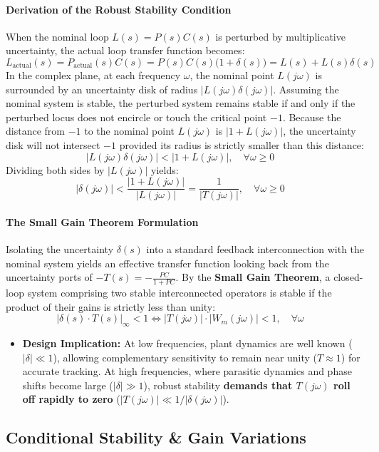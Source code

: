 \documentclass[12pt,onecolumn,twoside ]{article}
\begin{document}
	\paragraph{Derivation of the Robust Stability Condition}
	When the nominal loop $L(s) = P(s)C(s)$ is perturbed by multiplicative uncertainty, the actual loop transfer function becomes: \[
	L_{\text{actual}}(s) = P_{\text{actual}}(s)C(s) = P(s)C(s)\big(1 + \delta(s)\big) = L(s) + L(s)\delta(s) \quad
	\]
	In the complex plane, at each frequency $\omega$, the nominal point $L(j\omega)$ is surrounded by an uncertainty disk of radius $|L(j\omega)\delta(j\omega)|$. Assuming the nominal system is stable, the perturbed system remains stable if and only if the perturbed locus does not encircle or touch the critical point $-1$. Because the distance from $-1$ to the nominal point $L(j\omega)$ is $|1 + L(j\omega)|$, the uncertainty disk will not intersect $-1$ provided its radius is strictly smaller than this distance: \[
	|L(j\omega)\delta(j\omega)| < |1 + L(j\omega)|, \quad \forall \omega \ge 0 \quad
	\]
	Dividing both sides by $|L(j\omega)|$ yields: \[
	|\delta(j\omega)| < \frac{|1 + L(j\omega)|}{|L(j\omega)|} = \frac{1}{|T(j\omega)|}, \quad \forall \omega \ge 0 \quad
	\]
	\paragraph{The Small Gain Theorem Formulation}
	Isolating the uncertainty $\delta(s)$ into a standard feedback interconnection with the nominal system yields an effective transfer function looking back from the uncertainty ports of $-T(s) = -\frac{PC}{1 + PC}$. By the \textbf{Small Gain Theorem}, a closed-loop system comprising two stable interconnected operators is stable if the product of their gains is strictly less than unity: \[
	|\delta(s) \cdot T(s)|_\infty < 1 \iff |T(j\omega)| \cdot |W_m(j\omega)| < 1, \quad \forall \omega \quad
	\]
	\begin{itemize}
		\item
		\textbf{Design Implication:} At low frequencies, plant dynamics are well known ($|\delta| \ll 1$), allowing complementary sensitivity to remain near unity ($T \approx 1$) for accurate tracking. At high frequencies, where parasitic dynamics and phase shifts become large ($|\delta| \gg 1$), robust stability \textbf{demands that $T(j\omega)$ roll off rapidly to zero} ($|T(j\omega)| \ll 1/|\delta(j\omega)|$).
	\end{itemize}
	
	\subsection{Conditional Stability \& Gain Variations}
\end{document}

